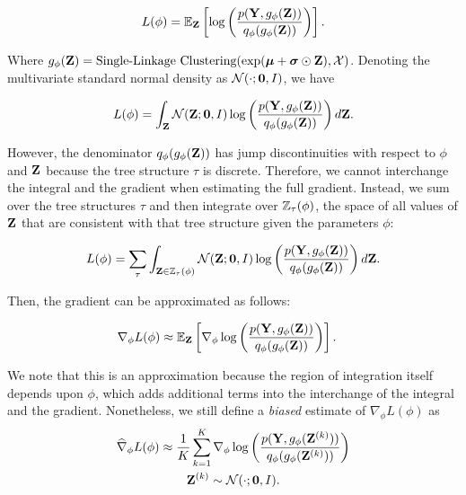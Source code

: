 \begin{equation}
    L(\phi) = \mathbb{E}_{\mathbf{Z}}\left[\log\left(\frac{p(\mathbf{Y}, g_{\phi}(\mathbf{Z}))}{q_\phi(g_{\phi}(\mathbf{Z}))}\right)\right].
\end{equation}

Where $g_{\phi}(\mathbf{Z}) = \text{Single-Linkage Clustering}(\exp(\boldsymbol{\mu} + \boldsymbol{\sigma} \odot \mathbf{Z}),\mathcal{X})$. Denoting the multivariate standard normal density as $\mathcal{N}(\cdot;\mathbf{0},I)$, we have

\begin{equation}
    L(\phi) = \int_{\mathbf{Z}} \mathcal{N}(\mathbf{Z};\mathbf{0},I) \log\left(\frac{p(\mathbf{Y}, g_{\phi}(\mathbf{Z}))}{q_\phi(g_{\phi}(\mathbf{Z}))}\right) d\mathbf{Z}.    
\end{equation}

However, the denominator $q_\phi(g_{\phi}(\mathbf{Z}))$ has jump discontinuities with respect to $\phi$ and $\mathbf{Z}$ because the tree structure $\tau$ is discrete. Therefore, we cannot interchange the integral and the gradient when estimating the full gradient. Instead, we sum over the tree structures $\tau$ and then integrate over $\mathbb{Z}_\tau(\phi)$, the space of all values of $\mathbf{Z}$ that are consistent with that tree structure given the parameters $\phi$:

\begin{equation}
    L(\phi) = \sum_{\tau} \int_{\mathbf{Z} \in \mathbb{Z}_{\tau}(\phi)} \mathcal{N}(\mathbf{Z};\mathbf{0},I) \log\left(\frac{p(\mathbf{Y}, g_{\phi}(\mathbf{Z}))}{q_\phi(g_{\phi}(\mathbf{Z}))}\right) d\mathbf{Z}.    
\end{equation}

Then, the gradient can be approximated as follows:

\begin{align}
    \nabla_{\phi} L(\phi) &\approx \mathbb{E}_{\mathbf{Z}}\left[\nabla_{\phi}\log\left(\frac{p(\mathbf{Y}, g_{\phi}(\mathbf{Z}))}{q_\phi(g_{\phi}(\mathbf{Z}))}\right)\right].     
\end{align}

We note that this is an approximation because the region of integration itself depends upon $\phi$, which adds additional terms into the interchange of the integral and the gradient. Nonetheless, we still define a \textit{biased} estimate of $\nabla_\phi L(\phi)$ as
%
\begin{gather}
    \widehat \nabla_\phi L(\phi) \approx \frac{1}{K} \sum_{k=1}^K \nabla_{\phi} \log\left(\frac{p(\mathbf{Y}, g_{\phi}(\mathbf{Z}^{(k)}))}{q_\phi(g_{\phi}(\mathbf{Z}^{(k)}))}\right)\\
    \mathbf{Z}^{(k)} \sim \mathcal{N}(\cdot;\mathbf{0},I).
\end{gather}

